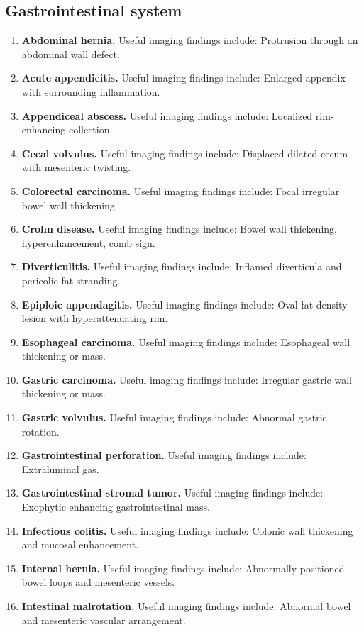 \subsection{Gastrointestinal system}
\begin{enumerate}[leftmargin=*,itemsep=0.45em,topsep=0.4em]
\item \textbf{Abdominal hernia.} Useful imaging findings include: Protrusion through an abdominal wall defect.
\item \textbf{Acute appendicitis.} Useful imaging findings include: Enlarged appendix with surrounding inflammation.
\item \textbf{Appendiceal abscess.} Useful imaging findings include: Localized rim-enhancing collection.
\item \textbf{Cecal volvulus.} Useful imaging findings include: Displaced dilated cecum with mesenteric twisting.
\item \textbf{Colorectal carcinoma.} Useful imaging findings include: Focal irregular bowel wall thickening.
\item \textbf{Crohn disease.} Useful imaging findings include: Bowel wall thickening, hyperenhancement, comb sign.
\item \textbf{Diverticulitis.} Useful imaging findings include: Inflamed diverticula and pericolic fat stranding.
\item \textbf{Epiploic appendagitis.} Useful imaging findings include: Oval fat-density lesion with hyperattenuating rim.
\item \textbf{Esophageal carcinoma.} Useful imaging findings include: Esophageal wall thickening or mass.
\item \textbf{Gastric carcinoma.} Useful imaging findings include: Irregular gastric wall thickening or mass.
\item \textbf{Gastric volvulus.} Useful imaging findings include: Abnormal gastric rotation.
\item \textbf{Gastrointestinal perforation.} Useful imaging findings include: Extraluminal gas.
\item \textbf{Gastrointestinal stromal tumor.} Useful imaging findings include: Exophytic enhancing gastrointestinal mass.
\item \textbf{Infectious colitis.} Useful imaging findings include: Colonic wall thickening and mucosal enhancement.
\item \textbf{Internal hernia.} Useful imaging findings include: Abnormally positioned bowel loops and mesenteric vessels.
\item \textbf{Intestinal malrotation.} Useful imaging findings include: Abnormal bowel and mesenteric vascular arrangement.

\end{enumerate}
